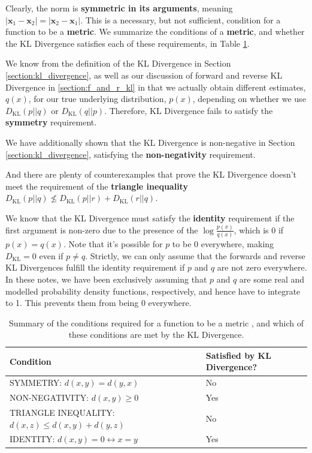 \documentclass[]{article}
\begin{document}
Clearly, the norm is \textbf{symmetric in its arguments}, meaning $|\textbf{x}_1-\textbf{x}_2| = |\textbf{x}_2-\textbf{x}_1|$. This is a necessary, but not sufficient, condition for a function to be a \textbf{metric}. We summarize the conditions of a \textbf{metric}, and whether the KL Divergence satisfies each of these requirements, in Table \ref{tab:is_kl_metric}.

We know from the definition of the KL Divergence in Section \ref{section:kl_divergence}, as well as our discussion of forward and reverse KL Divergence in \ref{section:f_and_r_kl} in that we actually obtain different estimates, $q(x)$, for our true underlying distribution, $p(x)$, depending on whether we use $D_{\text{KL}}(p||q)$ or $D_{\text{KL}}(q||p)$. Therefore, KL Divergence fails to satisfy the \textbf{symmetry} requirement.

We have additionally shown that the KL Divergence is non-negative in Section \ref{section:kl_divergence}, satisfying the \textbf{non-negativity} requirement. 

And there are plenty of counterexamples that prove the KL Divergence doesn't meet the requirement of the \textbf{triangle inequality} $D_\text{KL}(p||q) \nleq D_\text{KL}(p||r) + D_\text{KL}(r||q)$.

We know that the KL Divergence must satisfy the \textbf{identity} requirement if the first argument is non-zero due to the presence of the $\log \frac{p(x)}{q(x)}$, which is 0 if $p(x) = q(x)$. Note that it's possible for $p$ to be 0 everywhere, making $D_{\text{KL}} = 0$ even if $p\neq q$. Strictly, we can only assume that the forwards and reverse KL Divergences fulfill the identity requirement if $p$ and $q$ are not zero everywhere. In these notes, we have been exclusively assuming that $p$ and $q$ are some real and modelled probability density functions, respectively, and hence have to integrate to 1. This prevents them from being 0 everywhere.

\begin{table}[!h]
    \centering
    \begin{tabular}{ll}
\hline
\textbf{Condition}                                    & \textbf{Satisfied by KL Divergence?} \\ \hline
SYMMETRY: $d(x, y) = d(y, x)$                         & No                                   \\
NON-NEGATIVITY: $d(x, y) \geq 0$                      & Yes                                  \\
TRIANGLE INEQUALITY: $d(x, z) \leq d(x, y) + d(y, z)$ & No                                   \\
IDENTITY: $d(x, y) = 0 \leftrightarrow x = y$         & Yes                                  \\ \hline
\end{tabular}
    \caption{Summary of the conditions required for a function to be a metric \cite{Hunter_RealAnalysis_Ch13}, and which of these conditions are met by the KL Divergence.}
    \label{tab:is_kl_metric}
\end{table}
\end{document}
